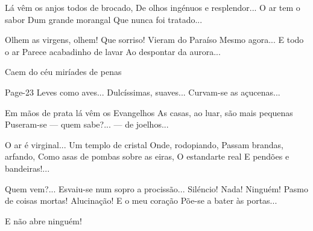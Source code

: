 Lá vêm os anjos todos de brocado,
De olhos ingénuos e resplendor...
O ar tem o sabor
Dum grande morangal
Que nunca foi tratado...

Olhem as virgens, olhem! Que sorriso!
Vieram do Paraíso
Mesmo agora...
E todo o ar
Parece acabadinho de lavar
Ao despontar da aurora...

Caem do céu miríades de penas




Page-23
Leves como aves...
Dulcíssimas, suaves...
Curvam-se as açucenas...

Em mãos de prata lá vêm os Evangelhos
As casas, ao luar, são mais pequenas
Puseram-se — quem sabe?... — de joelhos...

O ar é virginal...
Um templo de cristal
Onde, rodopiando,
Passam brandas, arfando,
Como asas de pombas sobre as eiras,
O estandarte real
E pendões e bandeiras!...

Quem vem?...
Esvaiu-se num sopro a procissão...
Siléncio! Nada! Ninguém!
Pasmo de coisas mortas!
Alucinação!
E o meu coração
Põe-se a bater às portas...

E não abre ninguém!